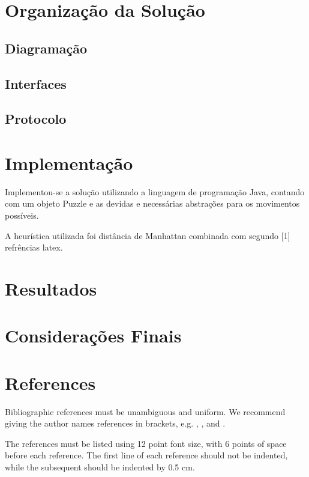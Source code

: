 \documentclass[12pt]{article}
\begin{document}
	\section{Organização da Solução}\label{sec:solucao}


		\subsection{Diagramação}\label{sec:diagramacao}


		\subsection{Interfaces}\label{sec:interfaces}


		\subsection{Protocolo}\label{sec:protocolo}


	\section{Implementação}\label{sec:implementacao}

	Implementou-se a solução utilizando a linguagem de programação Java, contando com um objeto Puzzle e as devidas e necessárias abstrações para os movimentos possíveis.

	A heurística utilizada foi distância de Manhattan combinada com segundo [1] refrências latex.

	\section{Resultados}\label{sec:resultados}	


	\section{Considerações Finais}\label{sec:consideracoesFinais}

	\section{References}

	Bibliographic references must be unambiguous and uniform.  We recommend giving
	the author names references in brackets, e.g. \cite{knuth:84},
	\cite{boulic:91}, and \cite{smith:99}.

	The references must be listed using 12 point font size, with 6 points of space
	before each reference. The first line of each reference should not be
	indented, while the subsequent should be indented by 0.5 cm.



\end{document}
